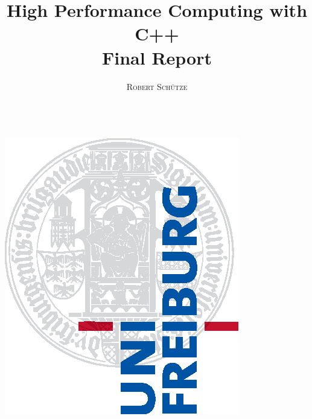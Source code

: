 \documentclass[a4paper,11pt]{report}
\title{\Huge \textbf{High Performance Computing with C++} \vspace{4mm} \\ \huge Final Report}
\author{\textsc{Robert Schütze} \\ \vspace{3mm}\text{4140641}  \\
\vspace{3mm}\text{schuetze.r@web.de}}
\begin{document}
\makeatletter
    \begin{titlepage}
        \begin{center}
            \includegraphics[width=0.5\linewidth]{logos/Uni_Logo-Grundversion_E1_A4_CMYK.eps}\\[4ex]
            {\huge \bfseries  \@title }\\[2ex] 
            {\LARGE  \@author}\\[30ex] 
            {\large \@date}
        \end{center}
    \end{titlepage}
\makeatother
\thispagestyle{empty}
\newpage



\tableofcontents
\newpage
\end{document}

